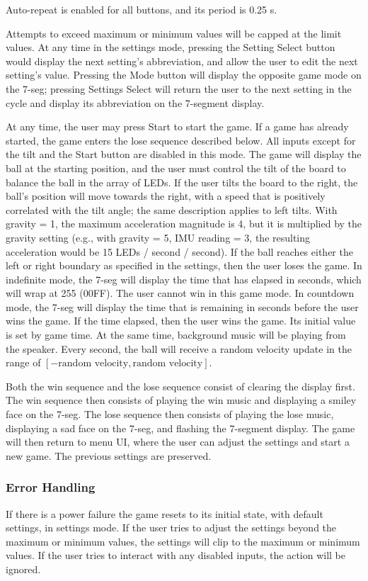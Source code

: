\documentclass[12pt]{article}
\begin{document}
Auto-repeat is enabled for all buttons, and its period is 0.25 s.

Attempts to exceed maximum or minimum values will be capped at the limit values. At any time in the settings mode, pressing the Setting Select button would display the next setting's abbreviation, and allow the user to edit the next setting's value. Pressing the Mode button will display the opposite game mode on the 7-seg; pressing Settings Select will return the user to the next setting in the cycle and display its abbreviation on the 7-segment display.

At any time, the user may press Start to start the game. If a game has already started, the game enters the lose sequence described below. All inputs except for the tilt and the Start button are disabled in this mode. The game will display the ball at the starting position, and the user must control the tilt of the board to balance the ball in the array of LEDs. If the user tilts the board to the right, the ball's position will move towards the right, with a speed that is positively correlated with the tilt angle; the same description applies to left tilts. With gravity = 1, the maximum acceleration magnitude is 4, but it is multiplied by the gravity setting (e.g., with gravity = 5, IMU reading = 3, the resulting acceleration would be 15 LEDs / second / second). If the ball reaches either the left or right boundary as specified in the settings, then the user loses the game. In indefinite mode, the 7-seg will display the time that has elapsed in seconds, which will wrap at 255 (00FF). The user cannot win in this game mode. In countdown mode, the 7-seg will display the time that is remaining in seconds before the user wins the game. If the time elapsed, then the user wins the game. Its initial value is set by game time. At the same time, background music will be playing from the speaker. Every second, the ball will receive a random velocity update in the range of $[-\text{random velocity}, \text{random velocity}]$.

Both the win sequence and the lose sequence consist of clearing the display first. The win sequence then consists of playing the win music and displaying a smiley face on the 7-seg. The lose sequence then consists of playing the lose music, displaying a sad face on the 7-seg, and flashing the 7-segment display. The game will then return to menu UI, where the user can adjust the settings and start a new game. The previous settings are preserved.

\subsubsection*{Error Handling}
If there is a power failure the game resets to its initial state, with default settings, in settings mode. If the user tries to adjust the settings beyond the maximum or minimum values, the settings will clip to the maximum or minimum values. If the user tries to interact with any disabled inputs, the action will be ignored. 
\end{document}
